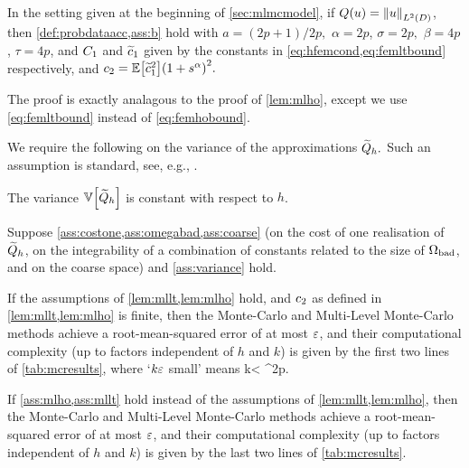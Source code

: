 \ble[Verifying assumptions for $Q(u) = \NLtD{u}$]\label{lem:mllt}
In the setting given at the beginning of \cref{sec:mlmcmodel}, if $Q(u) = \NLtD{u}$, then \cref{def:probdataacc,ass:b} hold with $a=(2p+1)/2p,$ $\alpha = 2p$, $\sigma = 2p,$ $\beta = 4p$, $\tau = 4p$, and $C_{1}$ and $\widetilde{c}_{1}$ given by the constants in \cref{eq:hfemcond,eq:femltbound} respectively, and $\ct = \EXP{\cotilde^2}\mleft(1+s^\alpha\mright)^2.$
\ele

The proof is exactly analagous to the proof of \cref{lem:mlho}, except we use \cref{eq:femltbound} instead of \cref{eq:femhobound}.
\epf



We require the following  on the variance of the approximations $\widetilde{Q}_{h}.$ Such an assumption is standard, see, e.g., \cite[Text below equation (3)]{ClGiScTe:11}.

\bas\label{ass:variance}
The variance $\VAR{\Qhtilde}$ is constant with respect to $h$.
\eas


Suppose \cref{ass:costone,ass:omegabad,ass:coarse} (on the cost of one realisation of $\widetilde{Q}_{h}$, on the integrability of a combination of constants related to the size of $\Omega_{\mathrm{bad}}$, and on the coarse space)  and \cref{ass:variance} hold.

\ben
\item If the assumptions of \cref{lem:mllt,lem:mlho} hold, and $c_{2}$ as defined in \cref{lem:mllt,lem:mlho} is finite, then the Monte-Carlo and Multi-Level Monte-Carlo methods achieve a root-mean-squared error of at most $\varepsilon$, and their computational complexity (up to factors independent of $h$ and $k$) is given by  the first two lines of \cref{tab:mcresults}, where `$k\varepsilon$ small' means
\beq\label{eq:kepscond}
k\eps < \co \Ccoarse^{2p}.
\eeq

\item If \cref{ass:mlho,ass:mllt} hold instead of the assumptions of \cref{lem:mllt,lem:mlho}, then the Monte-Carlo and Multi-Level Monte-Carlo methods achieve a root-mean-squared error of at most $\varepsilon$, and their computational complexity (up to factors independent of $h$ and $k$) is given by the last two lines of \cref{tab:mcresults}.
  \een
\label{thm:mcmlmchelmholtz}
\enth

